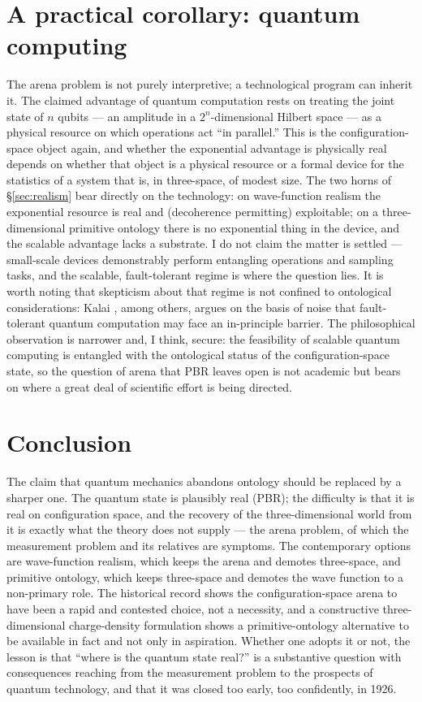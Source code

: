 \documentclass[11pt]{article}
\begin{document}
\section{A practical corollary: quantum computing}\label{sec:qc}

The arena problem is not purely interpretive; a technological program can inherit it. The claimed advantage of
quantum computation rests on treating the joint state of $n$ qubits --- an amplitude in a $2^n$-dimensional
Hilbert space --- as a physical resource on which operations act ``in parallel.'' This is the
configuration-space object again, and whether the exponential advantage is physically real depends on whether
that object is a physical resource or a formal device for the statistics of a system that is, in three-space, of
modest size. The two horns of \S\ref{sec:realism} bear directly on the technology: on wave-function realism the
exponential resource is real and (decoherence permitting) exploitable; on a three-dimensional primitive ontology
there is no exponential thing in the device, and the scalable advantage lacks a substrate. I do not claim the
matter is settled --- small-scale devices demonstrably perform entangling operations and sampling tasks, and the
scalable, fault-tolerant regime is where the question lies. It is worth noting that skepticism about that regime
is not confined to ontological considerations: Kalai \cite{Kalai}, among others, argues on the basis of noise
that fault-tolerant quantum computation may face an in-principle barrier. The philosophical observation is
narrower and, I think, secure: the feasibility of scalable quantum computing is entangled with the ontological
status of the configuration-space state, so the question of arena that PBR leaves open is not academic but bears
on where a great deal of scientific effort is being directed.

\section{Conclusion}\label{sec:conclusion}

The claim that quantum mechanics abandons ontology should be replaced by a sharper one. The quantum state is
plausibly real (PBR); the difficulty is that it is real on configuration space, and the recovery of the
three-dimensional world from it is exactly what the theory does not supply --- the arena problem, of which the
measurement problem and its relatives are symptoms. The contemporary options are wave-function realism, which
keeps the arena and demotes three-space, and primitive ontology, which keeps three-space and demotes the wave
function to a non-primary role. The historical record shows the configuration-space arena to have been a rapid
and contested choice, not a necessity, and a constructive three-dimensional charge-density formulation shows a
primitive-ontology alternative to be available in fact and not only in aspiration. Whether one adopts it or not,
the lesson is that ``where is the quantum state real?'' is a substantive question with consequences reaching from
the measurement problem to the prospects of quantum technology, and that it was closed too early, too
confidently, in 1926.
\end{document}
